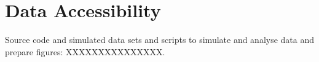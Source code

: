 \section{Data Accessibility}
Source code and simulated data sets and scripts to simulate and analyse data
and prepare figures: XXXXXXXXXXXXXXX.

